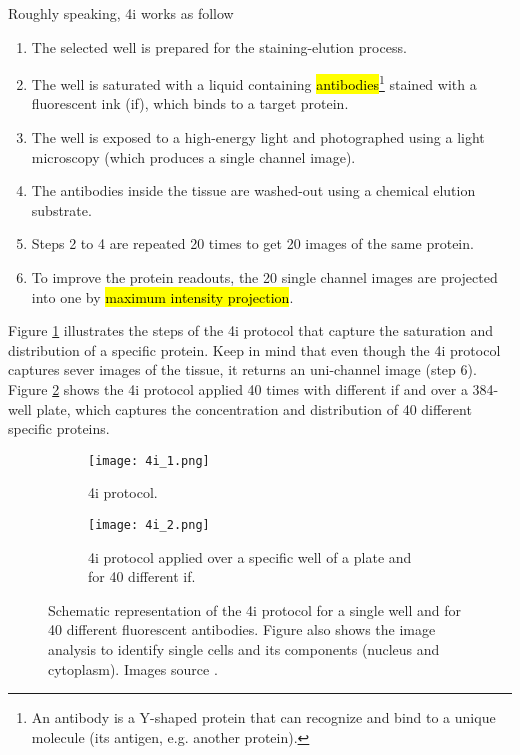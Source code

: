 Roughly speaking, \gls{4i} works as follow
\begin{enumerate}
  \item The selected well is prepared for the staining-elution process.
  \item The well is saturated with a liquid containing \hl{antibodies}\footnote{An antibody is a Y-shaped protein that can recognize and bind to a unique molecule (its antigen, e.g. another protein).} stained with a fluorescent ink (\gls{if}), which binds to a target protein.
  \item The well is exposed to a high-energy light and photographed using a light microscopy (which produces a single channel image).
  \item The antibodies inside the tissue are washed-out using a chemical elution substrate.
  \item Steps 2 to 4 are repeated 20 times to get 20 images of the same protein.
  \item To improve the protein readouts, the 20 single channel images are projected into one by \hl{maximum intensity projection}.
\end{enumerate}

Figure \ref{fig:4i:1} illustrates the steps of the \gls{4i} protocol that capture the saturation and distribution of a specific protein. Keep in mind that even though the \gls{4i} protocol captures sever images of the tissue, it returns an uni-channel image (step 6). Figure \ref{fig:4i:2} shows the \gls{4i} protocol applied 40 times with different \gls{if} and over a 384-well plate, which captures the concentration and distribution of 40 different specific proteins.

\begin{figure}[htb]
  \centering
  \begin{subfigure}[t]{.3\linewidth}
    \texttt{[image: 4i\_1.png]}
    \caption{\Acrfull{4i} protocol.}
    \label{fig:4i:1}
  \end{subfigure}
  \hspace{4mm}
  \begin{subfigure}[t]{.45\linewidth}
    \texttt{[image: 4i\_2.png]}
    \caption{\gls{4i} protocol applied over a specific well of a plate and for 40 different \gls{if}.}
    \label{fig:4i:2}
  \end{subfigure}%
  \caption{Schematic representation of the \gls{4i} protocol for a single well and for 40 different fluorescent antibodies. Figure  also shows the image analysis to identify single cells and its components (nucleus and cytoplasm). Images source \cite{Guteaar7042}.}
  \label{fig:4i}
\end{figure}

